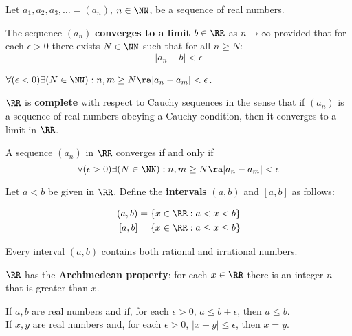\documentclass[11pt]{scrartcl}
\begin{document}
\begin{definition}
  Let $a_1, a_2, a_3, \dots = (a_n)$, $n\in\NN$, be a sequence of real numbers.\vs

  The sequence $(a_n)$ \textbf{converges to a limit} $b\in\RR$ as
  $n\to\infty$ provided that for each $\epsilon > 0$ there exists
  $N\in \NN$ such that for all $n\geq N$:
  \[|a_n-b| < \epsilon \]
\end{definition}

\begin{definition}
  $\forall(\epsilon<0)\exists(N\in\NN): n,m \geq N \ra |a_n-a_m|<\epsilon $.
\end{definition}
\begin{theorem}
  $\RR$ is \textbf{complete} with respect to Cauchy sequences in the
  sense that if $(a_n)$ is a sequence of real numbers obeying a Cauchy
  condition, then it converges to a limit in $\RR$.
\end{theorem}
\begin{theorem}
  A sequence $(a_n)$ in $\RR$ converges if and only if
  \[ \forall(\epsilon > 0)\exists(N\in\NN): n,m \geq N \ra |a_n-a_m|<\epsilon \]
\end{theorem}
\begin{definition}
  Let $a<b$ be given in $\RR$. Define the \textbf{intervals} $(a,b)$
  and $[a,b]$ as follows:

  \begin{align}
    (a,b) &= \{x\in\RR: a<x<b \}\\
    [a,b] &= \{x\in\RR: a\leq x\leq b \}
  \end{align}
\end{definition}

\begin{theorem}
Every interval $(a,b)$ contains both rational and irrational numbers.
\end{theorem}
\begin{lemma}
  $\RR$ has the \textbf{Archimedean property}: for each $x\in \RR$
  there is an integer $n$ that is greater than $x$.
\end{lemma}
\begin{theorem}
  If $a,b$ are real numbers and if, for each $\epsilon > 0$,
  $a \leq b + \epsilon$, then $a\leq b$.\\ If $x, y$ are real numbers and, for each $\epsilon>0$,
  $|x-y|\leq \epsilon$, then $x=y$.
\end{theorem}
\end{document}
